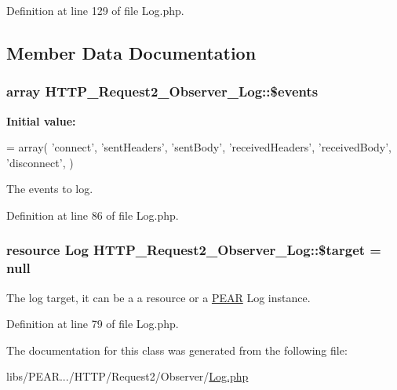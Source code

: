 Definition at line 129 of file Log.\+php.



\subsection{Member Data Documentation}
\hypertarget{classHTTP__Request2__Observer__Log_a28a4c14e527f6e34cbd3f0c1fa482e97}{}
\subsubsection[{\$events}]{\setlength{\rightskip}{0pt plus 5cm}array H\+T\+T\+P\+\_\+\+Request2\+\_\+\+Observer\+\_\+\+Log\+::\$events}\label{classHTTP__Request2__Observer__Log_a28a4c14e527f6e34cbd3f0c1fa482e97}
{\bfseries Initial value\+:}
\begin{DoxyCode}
= array(
        \textcolor{stringliteral}{'connect'},
        \textcolor{stringliteral}{'sentHeaders'},
        \textcolor{stringliteral}{'sentBody'},
        \textcolor{stringliteral}{'receivedHeaders'},
        \textcolor{stringliteral}{'receivedBody'},
        \textcolor{stringliteral}{'disconnect'},
    )
\end{DoxyCode}
The events to log. 

Definition at line 86 of file Log.\+php.

\hypertarget{classHTTP__Request2__Observer__Log_aadc9b19bcddc1bba14f73d3e23ce6214}{}
\subsubsection[{\$target}]{\setlength{\rightskip}{0pt plus 5cm}resource Log H\+T\+T\+P\+\_\+\+Request2\+\_\+\+Observer\+\_\+\+Log\+::\$target = null\hspace{0.3cm}{\ttfamily [protected]}}\label{classHTTP__Request2__Observer__Log_aadc9b19bcddc1bba14f73d3e23ce6214}
The log target, it can be a a resource or a \hyperlink{classPEAR}{P\+E\+A\+R} Log instance. 

Definition at line 79 of file Log.\+php.



The documentation for this class was generated from the following file\+:\begin{DoxyCompactItemize}
\item 
libs/\+P\+E\+A\+R.../\+H\+T\+T\+P/\+Request2/\+Observer/\hyperlink{Log_8php}{Log.\+php}\end{DoxyCompactItemize}
